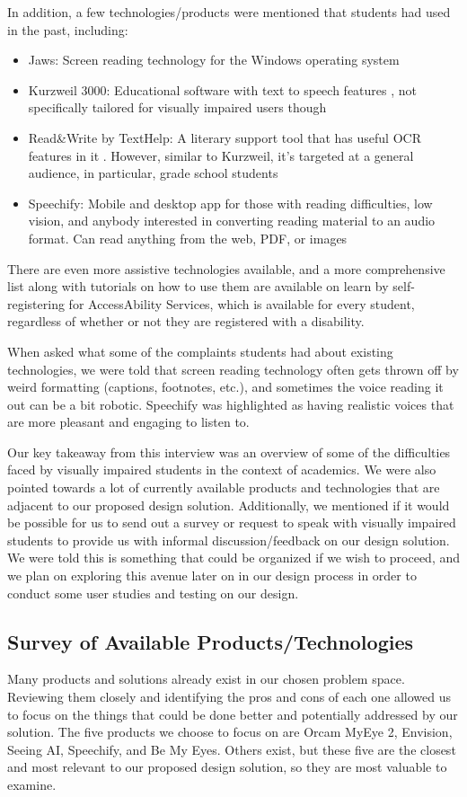 \documentclass[a4paper,11pt]{article}
\begin{document}
In addition, a few technologies/products were mentioned that students had used in the past, including:
\begin{itemize}
    \item Jaws: Screen reading technology for the Windows operating system \cite{jaws-software}
    \item Kurzweil 3000: Educational software with text to speech features \cite{kurzweil}, not specifically tailored for visually impaired users though
    \item Read\&Write by TextHelp: A literary support tool that has useful OCR features in it \cite{read-and-write}. However, similar to Kurzweil, it's targeted at a general audience, in particular, grade school students
    \item Speechify: Mobile and desktop app for those with reading difficulties, low vision, and anybody interested in converting reading material to an audio format. Can read anything from the web, PDF, or images \cite{speechify}
\end{itemize}

There are even more assistive technologies available, and a more comprehensive list along with tutorials on how to use them are available on learn by self-registering for AccessAbility Services, which is available for every student, regardless of whether or not they are registered with a disability.

When asked what some of the complaints students had about existing technologies, we were told that screen reading technology often gets thrown off by weird formatting (captions, footnotes, etc.), and sometimes the voice reading it out can be a bit robotic. Speechify was highlighted as having realistic voices that are more pleasant and engaging to listen to.

Our key takeaway from this interview was an overview of some of the difficulties faced by visually impaired students in the context of academics. We were also pointed towards a lot of currently available products and technologies that are adjacent to our proposed design solution. Additionally, we mentioned if it would be possible for us to send out a survey or request to speak with visually impaired students to provide us with informal discussion/feedback on our design solution. We were told this is something that could be organized if we wish to proceed, and we plan on exploring this avenue later on in our design process in order to conduct some user studies and testing on our design.

\subsection{Survey of Available Products/Technologies}
Many products and solutions already exist in our chosen problem space. Reviewing them closely and identifying the pros and cons of each one allowed us to focus on the things that could be done better and potentially addressed by our solution. The five products we choose to focus on are Orcam MyEye 2, Envision, Seeing AI, Speechify, and Be My Eyes. Others exist, but these five are the closest and most relevant to our proposed design solution, so they are most valuable to examine.
\end{document}
